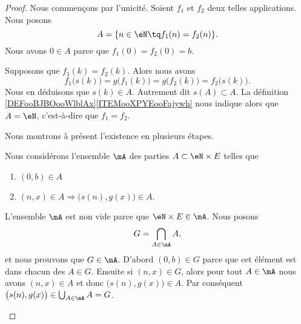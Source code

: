 \begin{proof}
	Nous commençons par l'unicité. Soient \( f_1\) et \( f_2\) deux telles applications. Nous posons
	\begin{equation}
		A=\{ n\in \eN\tq f_1(n)=f_2(n) \}.
	\end{equation}
	Nous avons \( 0\in A\) parce que \( f_1(0)=f_2(0)=b\).

	Supposons que \( f_1(k)=f_2(k)\). Alors nous avons
	\begin{equation}
		f_1\big( s(k) \big)=g\big( f_1(k) \big)=g\big( f_2(k) \big)=f_2\big( s(k) \big).
	\end{equation}
	Nous en déduisons que \( s(k)\in A\). Autrement dit \( s(A)\subset A\). La définition \ref{DEFooBJBOooWlblAx}\ref{ITEMooXPYEooFajywh} nous indique alors que \( A=\eN\), c'est-à-dire que \( f_1=f_2\).

	Nous montrons à présent l'existence en plusieurs étapes.
	\begin{subproof}
		Nous considérons l'ensemble \( \mA\) des parties \( A\subset \eN\times E\) telles que
		\begin{enumerate}
			\item
			      \( (0,b)\in A\)
			\item
			      \( (n,x)\in A \Rightarrow \big( s(n),g(x) \big)\in A\).
		\end{enumerate}
		L'ensemble \( \mA\) est non vide parce que \( \eN\times E\in \mA\).
		Nous posons
		\begin{equation}
			G=\bigcap_{A\in \mA}A,
		\end{equation}
		et nous prouvons que \( G\in\mA\). D'abord \( (0,b)\in G\) parce que cet élément est dans chacun des \( A\in G\). Ensuite si \( (n,x)\in G\), alors pour tout \( A\in\mA \) nous avons \( (n,x)\in A\) et donc \( \big( s(n),g(x) \big)\in A\). Par conséquent \( \big( s(n),g(x) \big)\in \bigcup_{A\in\mA}A=G\).


\end{subproof}
\end{proof}
